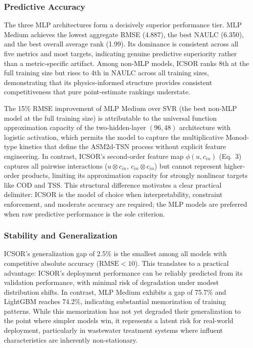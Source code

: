 \documentclass[11pt]{article}
\begin{document}
\subsubsection{Predictive Accuracy}

The three MLP architectures form a decisively superior performance tier. MLP Medium achieves the lowest aggregate RMSE (4.887), the best NAULC (6.350), and the best overall average rank (1.99). Its dominance is consistent across all five metrics and most targets, indicating genuine predictive superiority rather than a metric-specific artifact. Among non-MLP models, ICSOR ranks 8th at the full training size but rises to 4th in NAULC across all training sizes, demonstrating that its physics-informed structure provides consistent competitiveness that pure point-estimate rankings understate.

The 15\% RMSE improvement of MLP Medium over SVR (the best non-MLP model at the full training size) is attributable to the universal function approximation capacity of the two-hidden-layer $(96, 48)$ architecture with logistic activation, which permits the model to capture the multiplicative Monod-type kinetics that define the ASM2d-TSN process without explicit feature engineering. In contrast, ICSOR's second-order feature map $\phi(u, c_{in})$ (Eq.~3) captures all pairwise interactions ($u \otimes c_{in}$, $c_{in} \otimes c_{in}$) but cannot represent higher-order products, limiting its approximation capacity for strongly nonlinear targets like COD and TSS. This structural difference motivates a clear practical delimiter: ICSOR is the model of choice when interpretability, constraint enforcement, and moderate accuracy are required; the MLP models are preferred when raw predictive performance is the sole criterion.

\subsubsection{Stability and Generalization}

ICSOR's generalization gap of 2.5\% is the smallest among all models with competitive absolute accuracy ($\mathrm{RMSE} < 10$). This translates to a practical advantage: ICSOR's deployment performance can be reliably predicted from its validation performance, with minimal risk of degradation under modest distribution shifts. In contrast, MLP Medium exhibits a gap of 75.7\% and LightGBM reaches 74.2\%, indicating substantial memorization of training patterns. While this memorization has not yet degraded their generalization to the point where simpler models win, it represents a latent risk for real-world deployment, particularly in wastewater treatment systems where influent characteristics are inherently non-stationary.
\end{document}

